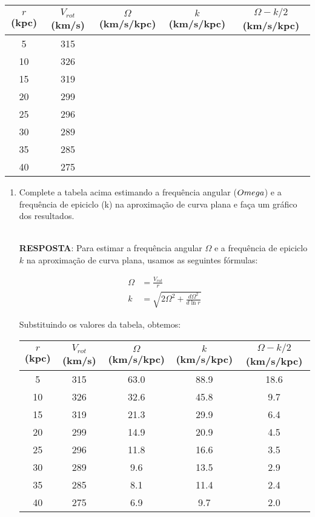 \documentclass[a4paper,12pt]{article}
\begin{document}
\begin{enumerate}
\begin{tabular}{|c|c|c|c|c|}
\hline
$r$ (kpc) & $V_{rot}$ (km/s) & $\Omega$ (km/s/kpc) & $k$ (km/s/kpc) & $\Omega-k/2$ (km/s/kpc) \\ \hline
5 & 315 & & & \\
\hline
10 & 326 & & & \\
\hline
15 & 319 & & & \\
\hline
20 & 299 & & & \\
\hline
25 & 296 & & & \\
\hline
30 & 289 & & & \\
\hline
35 & 285 & & & \\
\hline
40 & 275 & & & \\
\hline
\end{tabular}

\begin{enumerate}
\item Complete a tabela acima estimando a frequência angular ($\\Omega$) e a frequência de epiciclo (k) na aproximação de curva plana e faça um gráfico dos resultados.

\noindent\hrulefill\\\textbf{RESPOSTA}: Para estimar a frequência angular $\Omega$ e a frequência de epiciclo $k$ na aproximação de curva plana, usamos as seguintes fórmulas:

\begin{align*}
\Omega &= \frac{V_{rot}}{r} \\
k &= \sqrt{2\Omega^2 + \frac{d\Omega^2}{d\ln r}}
\end{align*}

Substituindo os valores da tabela, obtemos:


\begin{tabular}{|c|c|c|c|c|}
\hline
$r$ (kpc) & $V_{rot}$ (km/s) & $\Omega$ (km/s/kpc) & $k$ (km/s/kpc) & $\Omega-k/2$ (km/s/kpc) \\ \hline
5 & 315 & 63.0 & 88.9 & 18.6 \\ \hline
10 & 326 & 32.6 & 45.8 & 9.7 \\ \hline
15 & 319 & 21.3 & 29.9 & 6.4 \\ \hline
20 & 299 & 14.9 & 20.9 & 4.5 \\ \hline
25 & 296 & 11.8 & 16.6 & 3.5 \\ \hline
30 & 289 & 9.6 & 13.5 & 2.9 \\ \hline
35 & 285 & 8.1 & 11.4 & 2.4 \\ \hline
40 & 275 & 6.9 & 9.7 & 2.0 \\ \hline
\end{tabular}
\\


\end{enumerate}
\end{enumerate}
\end{document}
